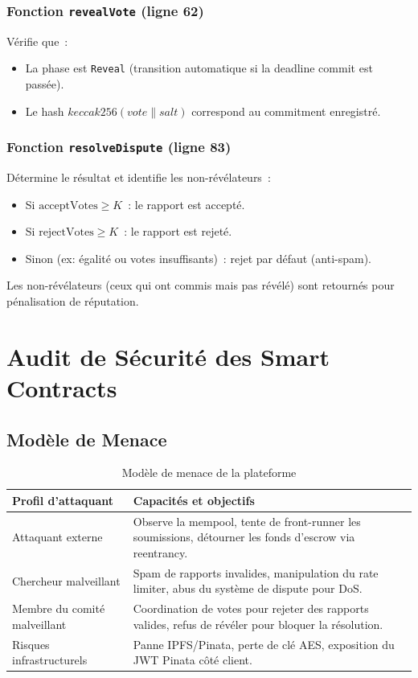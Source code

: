 \documentclass[12pt, a4paper]{report}
\begin{document}
\subsection{Fonction \texttt{revealVote} (ligne 62)}
V\'{e}rifie que~:
\begin{itemize}
    \item La phase est \texttt{Reveal} (transition automatique si la deadline commit est pass\'{e}e).
    \item Le hash $keccak256(vote \| salt)$ correspond au commitment enregistr\'{e}.
\end{itemize}

\subsection{Fonction \texttt{resolveDispute} (ligne 83)}
D\'{e}termine le r\'{e}sultat et identifie les non-r\'{e}v\'{e}lateurs~:
\begin{itemize}
    \item Si $\text{acceptVotes} \geq K$~: le rapport est accept\'{e}.
    \item Si $\text{rejectVotes} \geq K$~: le rapport est rejet\'{e}.
    \item Sinon (ex: \'{e}galit\'{e} ou votes insuffisants)~: rejet par d\'{e}faut (anti-spam).
\end{itemize}
Les non-r\'{e}v\'{e}lateurs (ceux qui ont commis mais pas r\'{e}v\'{e}l\'{e}) sont retourn\'{e}s pour p\'{e}nalisation de r\'{e}putation.

\chapter{Audit de S\'{e}curit\'{e} des Smart Contracts}

\section{Mod\`{e}le de Menace}
\begin{table}[H]
\centering
\begin{tabular}{@{}lp{10cm}@{}}
\toprule
\textbf{Profil d'attaquant} & \textbf{Capacit\'{e}s et objectifs} \\ \midrule
Attaquant externe & Observe la mempool, tente de front-runner les soumissions, d\'{e}tourner les fonds d'escrow via reentrancy. \\
Chercheur malveillant & Spam de rapports invalides, manipulation du rate limiter, abus du syst\`{e}me de dispute pour DoS. \\
Membre du comit\'{e} malveillant & Coordination de votes pour rejeter des rapports valides, refus de r\'{e}v\'{e}ler pour bloquer la r\'{e}solution. \\
Risques infrastructurels & Panne IPFS/Pinata, perte de cl\'{e} AES, exposition du JWT Pinata c\^{o}t\'{e} client. \\ \bottomrule
\end{tabular}
\caption{Mod\`{e}le de menace de la plateforme}
\end{table}
\end{document}
